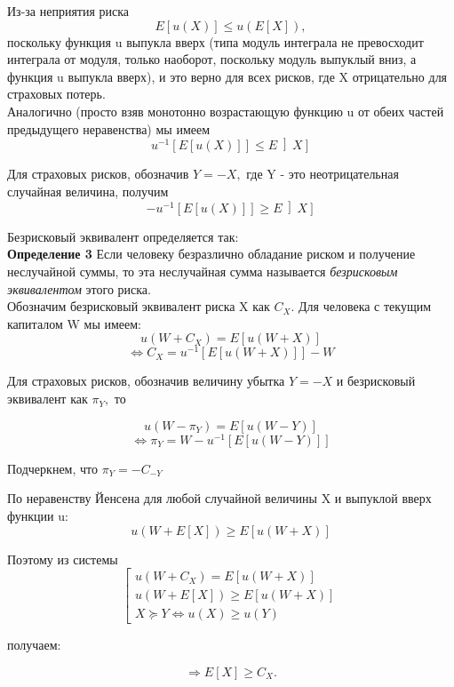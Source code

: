 \documentclass[12pt,a4paper]{article}
\begin{document}
Из-за неприятия риска $$ E \left[  u(X) \right]   \leq  u(E  \left[  X \right]  ),$$
поскольку функция u выпукла вверх (типа модуль интеграла не превосходит интеграла от модуля, только наоборот, поскольку модуль выпуклый вниз, а функция u выпукла вверх), и это верно для всех рисков, где X отрицательно для страховых потерь.\\
Аналогично (просто взяв монотонно возрастающую функцию u от обеих частей предыдущего неравенства) мы имеем $$u^{-1}  \left[ E \left[ u(X) \right] \right]   \leq  E  \left]  X \right]  $$

Для страховых рисков, обозначив $Y=-X,$ где Y - это неотрицательная случайная величина, получим 
$$ - u^{-1}  \left[ E \left[ u(X) \right] \right]   \geq  E  \left]  X \right]  $$

Безрисковый эквивалент  определяется так:\\

{\bf Определение 3}  Если человеку безразлично обладание риском и получение неслучайной суммы, то эта неслучайная сумма называется { \itshape безрисковым эквивалентом } этого риска.\\

Обозначим безрисковый эквивалент риска X как $C_X.$ Для человека с текущим капиталом W мы имеем:
$$u(W + C_X) = E \left[   u(W + X)  \right]  $$
$$\Leftrightarrow C_X = u^{-1}  \left[  E \left[   u(W + X)  \right]  \right]  - W$$

Для страховых рисков, обозначив величину убытка $Y=-X$ и безрисковый эквивалент как $\pi_Y,$ то

$$ u(W  -  \pi_Y ) = E \left[   u(W - Y)  \right] $$
$$\Leftrightarrow  \pi_Y =  W- u^{-1}  \left[  E \left[   u(W - Y)  \right]  \right]  $$

Подчеркнем, что $  \pi_Y = - C_{-Y}$

По неравенству Йенсена для любой случайной величины X и выпуклой вверх функции u:
$$ u(W + E \left[ X \right] )  \geq  E \left[   u(W + X)  \right]  $$

Поэтому из системы 
$$\left[ \begin{array}{crl}
u(W + C_X) = E \left[   u(W + X)  \right] \\
u(W + E \left[ X \right] )  \geq  E \left[   u(W + X)  \right]\\
X \succeq Y \Leftrightarrow u(X) \geq  u(Y)
\end{array}\right. $$

получаем:

$$\Rightarrow  E \left[ X \right]   \geq  C_X.$$
\end{document}
